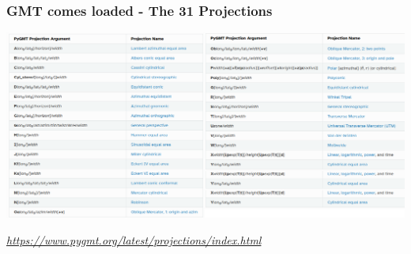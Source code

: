 \documentclass[unknownkeysallowed]{beamer}
\begin{document}
\begin{frame}[fragile=singleslide]
\frametitle{GMT comes loaded - The 31 Projections}
	\begin{center}
			\includegraphics[width=\textwidth]{../figures/pygmt_projections_list.png}	
	\end{center}
	\begin{flushright}
	\vspace{-0.35cm}
	\tiny{\emph{\url{https://www.pygmt.org/latest/projections/index.html}}}
	\end{flushright}	

\end{frame}
\end{document}
